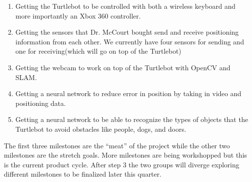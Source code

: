 \documentclass[12pt]{IEEEtran}
\begin{document}
\begin{enumerate}
    \item Getting the Turtlebot to be controlled with both a wireless keyboard and more importantly an Xbox 360 controller.
    \item Getting the sensors that Dr. McCourt bought send and receive positioning information 
    from each other. We currently have four sensors for sending and one for receiving(which 
    will go on top of the Turtlebot)
    \item Getting the webcam to work on top of the Turtlebot with OpenCV and SLAM.
    \item Getting a neural network to reduce error in position by taking in video and 
    positioning data.
    \item Getting a neural network to be able to recognize the types of objects that the Turtlebot to avoid obstacles like people, dogs, and doors.
\end{enumerate}
\noindent \indent The first three milestones are the ``meat'' of the project while the other two milestones are the stretch goals. More milestones are being workshopped but this is the current product cycle. After step 3 the two groups will diverge exploring different milestones to be finalized later this quarter. 
\end{document}
